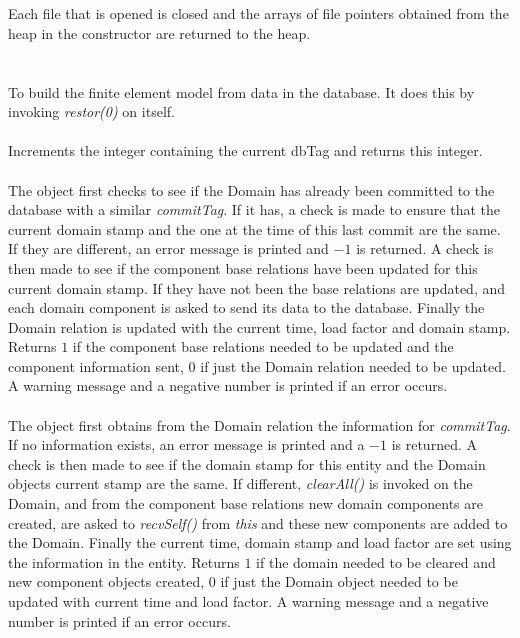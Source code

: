  \\
\\ 
Each file that is opened is closed and the arrays of file pointers
obtained from the heap in the constructor are returned to the heap. \\

  \\
\\ 
To build the finite element model from data in the database. It does
this by invoking {\em restor(0)} on itself. \\

\\
Increments the integer containing the current dbTag and returns this
integer. \\

\\
The object first checks to see if the Domain has already been
committed to the database with a similar {\em commitTag}. If it has, a
check is made to ensure that the current domain stamp and the one at
the time of this last commit are the same. If they are different, an
error message is printed and $-1$ is returned. A check is then made to
see if the component base relations have been updated for this current domain
stamp. If they have not been the base relations are updated, and each
domain component is asked to send its data to the database. Finally
the Domain relation is updated with the current time, load factor and
domain stamp. Returns $1$ if the component base relations needed to be updated
and the component information sent, $0$ if just the Domain relation
needed to be updated. A warning message and a negative number is
printed if an error occurs. \\


\\ 
The object first obtains from the Domain relation the information for
{\em commitTag}. If no information exists, an error message is printed
and a $-1$ is returned. A check is then made to see if the domain
stamp for this entity and the Domain objects current stamp are the
same. If different, {\em clearAll()} is invoked on the Domain, and
from the component base relations new domain components are created,
are asked to {\em recvSelf()} from {\em *this} and these new
components are added to the Domain. Finally the current time, domain
stamp and load factor are set using the information in the entity. 
Returns $1$ if the domain needed to be cleared and new component
objects created, $0$ if just the Domain object needed to be updated
with current time and load factor. A warning message and a negative
number is printed if an error occurs. \\

